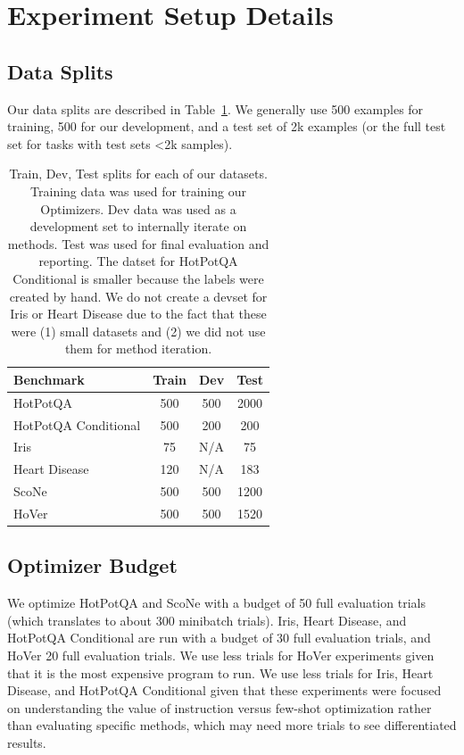 \section{Experiment Setup Details}
\label{experiment_hyperparameters}

\subsection{Data Splits}\label{sec:data_splits}

Our data splits are described in Table~\ref{tab:test_train_split}.  We generally use 500 examples for training, 500 for our development, and a test set of 2k examples (or the full test set for tasks with test sets <2k samples).

\begin{table}[tp]
\begin{center}
\small
\begin{tabular}{lccc}
\toprule
\textbf{Benchmark} & \textbf{Train} & \textbf{Dev} & \textbf{Test} \\ \midrule
HotPotQA & 500 & 500 & 2000 \\
HotPotQA Conditional & 500 & 200 & 200 \\
Iris & 75 & N/A & 75 \\
Heart Disease & 120 & N/A & 183 \\
ScoNe & 500 & 500 & 1200 \\
HoVer & 500 & 500 & 1520 \\
\bottomrule
\end{tabular}
\caption{Train, Dev, Test splits for each of our datasets. Training data was used for training our Optimizers. Dev data was used as a development set to internally iterate on methods. Test was used for final evaluation and reporting. The datset for HotPotQA Conditional is smaller because the labels were created by hand. We do not create a devset for Iris or Heart Disease due to the fact that these were (1) small datasets and (2) we did not use them for method iteration.}
\label{tab:test_train_split}
\end{center}
\end{table}

\subsection{Optimizer Budget}
We optimize HotPotQA and ScoNe with a budget of 50 full evaluation trials (which translates to about 300 minibatch trials).
Iris, Heart Disease, and HotPotQA Conditional are run with a budget of 30 full evaluation trials, and HoVer 20 full evaluation trials. We use less trials for HoVer experiments given that it is the most expensive program to run. We use less trials for Iris, Heart Disease, and HotPotQA Conditional given that these experiments were focused on understanding the value of instruction versus few-shot optimization rather than evaluating specific methods, which may need more trials to see differentiated results.
